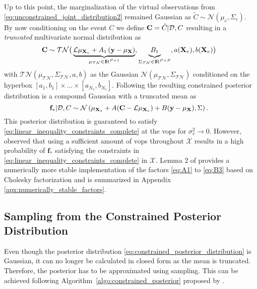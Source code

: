 Up to this point, the marginalization of the virtual observations from \eqref{eq:unconstrained_joint_distribution2} remained Gaussian as ${\tilde{C} \sim \mathcal{N}(\mu_c, \Sigma_c)}$. By now conditioning on the event $C$ we define $\mathrm{\mathbf{C}} = \tilde{C} | \mathcal{D}, C$ resulting in a \emph{truncated} multivariate normal distribution as
\begin{equation}
    \MatBold{C} \sim \mathcal{TN} \big(\underbrace{\mathcal{L}\mu_{\mathbf{X}_v} + A_1 \left( \mathbf{y} - \mu_{\mathbf{X}}\right)}_{\mu_{\mathcal{TN}} \in \R^{P \times 1}}, \underbrace{\vphantom{\mathcal{L}\mu_{\mathbf{X}_v} + A_1 \left( \mathbf{y} - \mu_{\mathbf{X}}\right)}B_1}_{\Sigma_{\mathcal{TN}} \in \R^{P \times P}} ,a(\mathbf{X}_v), b(\mathbf{X}_v) \big)
    \label{eq:truncated_mvn}
\end{equation}
with $\mathcal{TN}(\mu_{\mathcal{TN}}, \Sigma_{\mathcal{TN}}, a, b)$ as the Gaussian $\mathcal{N}(\mu_{\mathcal{TN}}, \Sigma_{\mathcal{TN}})$ conditioned on the hyperbox $[a_1, b_1]\times\dots\times[a_{N_v}, b_{N_v}]$. Following \textcite[Lemma 1]{Agrell_2019} the resulting constrained posterior distribution is a compound Gaussian with a truncated mean as
\begin{equation}
    \mathbf{f_*} | \mathcal{D}, C \sim \mathcal{N} \left(\mu_{\mathbf{X}_*} + A (\mathrm{\mathbf{C}} - \mathcal{L}\mu_{\mathbf{X}_v}) + B (\mathbf{y} - \mu_{\mathbf{X}}), \Sigma \right).
    \label{eq:constrained_posterior_distribution}
\end{equation}
This posterior distribution is guaranteed to satisfy \eqref{eq:linear_inequality_constraints_complete} at the \glspl{vop} for ${\sigma_v^2 \to 0}$. However, \textcite{Wang_2016} observed that using a sufficient amount of \glspl{vop} throughout $\mathcal{X}$ results in a high probability of $\mathbf{f}_*$ satisfying the constraints in \eqref{eq:linear_inequality_constraints_complete} in $\mathcal{X}$.
Lemma 2 of \textcite{Agrell_2019} provides a numerically more stable implementation of the factors \eqref{eq:A1} to \eqref{eq:B3} based on Cholesky factorization and is summarized in Appendix \ref{apx:numerically_stable_factors}.

\subsection{Sampling from the Constrained Posterior Distribution}
\label{sec:sampling_posterior}

Even though the posterior distribution \eqref{eq:constrained_posterior_distribution} is Gaussian, it can no longer be calculated in closed form as the mean is truncated. Therefore, the posterior has to be approximated using sampling. This can be achieved following Algorithm~\ref{algo:constrained_posterior} proposed by \textcite[Algorithm~3]{Agrell_2019}.

